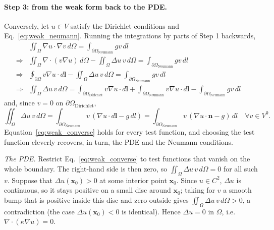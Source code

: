 \documentclass{article}
\newcommand{\tmop}[1]{\ensuremath{\operatorname{#1}}}
\begin{document}
\paragraph{Step 3: from the weak form back to the PDE.} Conversely, let $u \in V$
satisfy the Dirichlet conditions and Eq.~\eqref{eq:weak_neumann}. Running the
integrations by parts of Step 1 backwards,
\begin{eqnarray*}
  & \displaystyle\iint_{\Omega} \nabla u \cdot \nabla v \, d\Omega = \int_{\partial
  \Omega_{\tmop{Neumann}}} g v \, dl &  \\
  \Rightarrow & \displaystyle\iint_{\Omega} \nabla \cdot (v \nabla u) \, d\Omega -
  \iint_{\Omega} \Delta u \, v \, d\Omega = \int_{\partial \Omega_{\tmop{Neumann}}} g v
  \, dl &  \\
  \Rightarrow & \displaystyle\oint_{\partial \Omega} v \nabla u \cdot d\mathbf{l} -
  \iint_{\Omega} \Delta u \, v \, d\Omega = \int_{\partial \Omega_{\tmop{Neumann}}} g v
  \, dl &  \\
  \Rightarrow & \displaystyle\iint_{\Omega} \Delta u \, v \, d\Omega = \int_{\partial
  \Omega_{\tmop{Dirichlet}}} v \nabla u \cdot d\mathbf{l} + \int_{\partial
  \Omega_{\tmop{Neumann}}} v \nabla u \cdot d\mathbf{l} - \int_{\partial
  \Omega_{\tmop{Neumann}}} g v \, dl & 
\end{eqnarray*}
and, since $v = 0$ on $\partial \Omega_{\tmop{Dirichlet}}$,
\begin{equation}
  \label{eq:weak_converse}
  \iint_{\Omega} \Delta u \, v \, d\Omega = \int_{\partial \Omega_{\tmop{Neumann}}} v
  \, (\nabla u \cdot d\mathbf{l} - g \, dl) = \int_{\partial
  \Omega_{\tmop{Neumann}}} v \, (\nabla u \cdot \mathbf{n} - g) \, dl \quad
  \forall v \in V^0 .
\end{equation}
Equation~\eqref{eq:weak_converse} holds for every test function, and choosing
the test function cleverly recovers, in turn, the PDE and the Neumann
conditions.

\emph{The PDE.} Restrict Eq.~\eqref{eq:weak_converse} to test functions that
vanish on the whole boundary. The right-hand side is then zero, so
$\iint_{\Omega} \Delta u \, v \, d\Omega = 0$ for all such $v$. Suppose that
$\Delta u (\mathbf{x}_0) > 0$ at some interior point $\mathbf{x}_0$. Since $u \in
C^2$, $\Delta u$ is continuous, so it stays positive on a small disc around
$\mathbf{x}_0$; taking for $v$ a smooth bump that is positive inside this disc
and zero outside gives $\iint_{\Omega} \Delta u \, v \, d\Omega > 0$, a
contradiction (the case $\Delta u (\mathbf{x}_0) < 0$ is identical). Hence
$\Delta u = 0$ in $\Omega$, i.e. $\nabla \cdot (\kappa \nabla u) = 0$.
\end{document}
